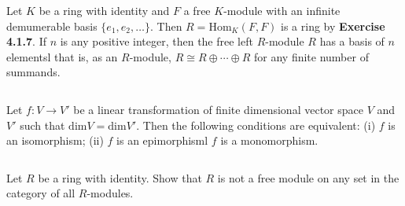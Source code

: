 \begin{ex}
    Let $K$ be a ring with identity and $F$ a free $K$-module with an infinite demumerable basis $\{e_{1},e_{2},\dots\}$. Then $R=\mathrm{Hom}_{K}(F,F)$ is a ring by \textbf{Exercise 4.1.7}. If $n$ is any positive integer, then the free left $R$-module $R$ has a basis of $n$ elementsl that is,  as an $R$-module, $R\cong R\oplus\cdots\oplus R$ for any finite number of summands.
\end{ex}

$$ $$

\begin{ex}
    Let $f:V\to V'$ be a linear transformation of finite dimensional vector space $V$ and $V'$ such that $\mathrm{dim}V=\mathrm{dim}V'$. Then the following conditions are equivalent: (i) $f$ is an isomorphism; (ii) $f$ is an epimorphisml $f$ is a monomorphism.
\end{ex}

$$ $$

\begin{ex}
    Let $R$ be a ring with identity. Show that $R$ is not a free module on any set in the category of all $R$-modules.
\end{ex}